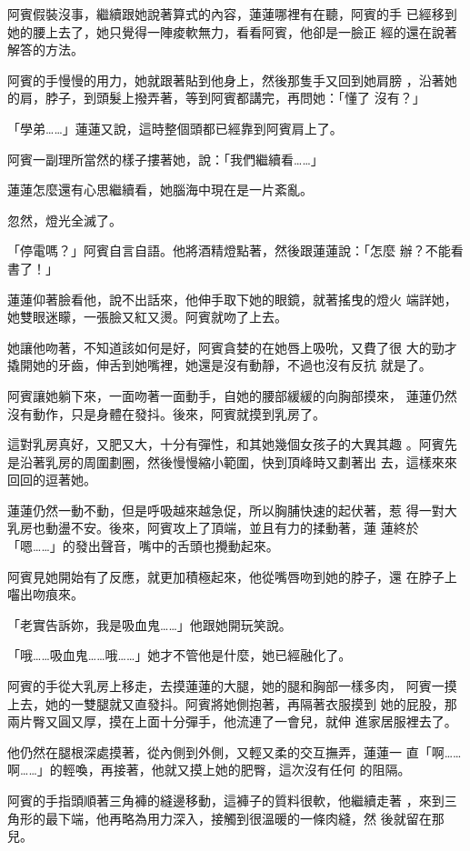 阿賓假裝沒事，繼續跟她說著算式的內容，蓮蓮哪裡有在聽，阿賓的手
已經移到她的腰上去了，她只覺得一陣痠軟無力，看看阿賓，他卻是一臉正
經的還在說著解答的方法。

阿賓的手慢慢的用力，她就跟著貼到他身上，然後那隻手又回到她肩膀
，沿著她的肩，脖子，到頭髮上撥弄著，等到阿賓都講完，再問她：「懂了
沒有？」

「學弟……」蓮蓮又說，這時整個頭都已經靠到阿賓肩上了。

阿賓一副理所當然的樣子摟著她，說：「我們繼續看……」

蓮蓮怎麼還有心思繼續看，她腦海中現在是一片紊亂。

忽然，燈光全滅了。

「停電嗎？」阿賓自言自語。他將酒精燈點著，然後跟蓮蓮說：「怎麼
辦？不能看書了！」

蓮蓮仰著臉看他，說不出話來，他伸手取下她的眼鏡，就著搖曳的燈火
端詳她，她雙眼迷矇，一張臉又紅又燙。阿賓就吻了上去。

她讓他吻著，不知道該如何是好，阿賓貪婪的在她唇上吸吮，又費了很
大的勁才撬開她的牙齒，伸舌到她嘴裡，她還是沒有動靜，不過也沒有反抗
就是了。

阿賓讓她躺下來，一面吻著一面動手，自她的腰部緩緩的向胸部摸來，
蓮蓮仍然沒有動作，只是身體在發抖。後來，阿賓就摸到乳房了。

這對乳房真好，又肥又大，十分有彈性，和其她幾個女孩子的大異其趣
。阿賓先是沿著乳房的周圍劃圈，然後慢慢縮小範圍，快到頂峰時又劃著出
去，這樣來來回回的逗著她。

蓮蓮仍然一動不動，但是呼吸越來越急促，所以胸脯快速的起伏著，惹
得一對大乳房也動盪不安。後來，阿賓攻上了頂端，並且有力的揉動著，蓮
蓮終於「嗯……」的發出聲音，嘴中的舌頭也攪動起來。

阿賓見她開始有了反應，就更加積極起來，他從嘴唇吻到她的脖子，還
在脖子上囓出吻痕來。

「老實告訴妳，我是吸血鬼……」他跟她開玩笑說。

「哦……吸血鬼……哦……」她才不管他是什麼，她已經融化了。

阿賓的手從大乳房上移走，去摸蓮蓮的大腿，她的腿和胸部一樣多肉，
阿賓一摸上去，她的一雙腿就又直發抖。阿賓將她側抱著，再隔著衣服摸到
她的屁股，那兩片臀又圓又厚，摸在上面十分彈手，他流連了一會兒，就伸
進家居服裡去了。

他仍然在腿根深處摸著，從內側到外側，又輕又柔的交互撫弄，蓮蓮一
直「啊……啊……」的輕喚，再接著，他就又摸上她的肥臀，這次沒有任何
的阻隔。

阿賓的手指頭順著三角褲的縫邊移動，這褲子的質料很軟，他繼續走著
，來到三角形的最下端，他再略為用力深入，接觸到很溫暖的一條肉縫，然
後就留在那兒。

